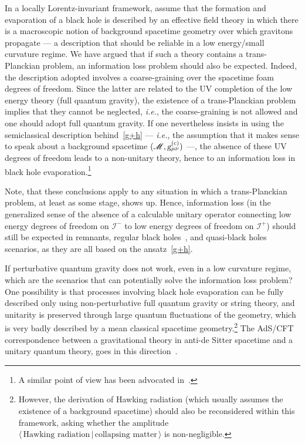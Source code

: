\documentclass[prd,groupedaddress, showpacs, showkeys, onecolumn, nofootinbib, 12pt]{revtex4-2}
\def\g{{\mbox{\sl g}}}%
\def\ie{{\em i.e.\/}}%
\newcommand{\scri}{\mathscr{I}}
\begin{document}
In a locally Lorentz-invariant framework, assume that the formation and evaporation of a black hole is described by an effective field theory in which there is a macroscopic notion of background spacetime geometry over which gravitons propagate --- a description that should be reliable in a low energy/small curvature regime.  We have argued that if such a theory contains a trans-Planckian problem, an information loss problem should also be expected.  Indeed, the description adopted involves a coarse-graining over the spacetime foam degrees of freedom.  Since the latter are related to the UV completion of the low energy theory (full quantum gravity), the existence of a trans-Planckian problem implies that they cannot be neglected, \ie, the coarse-graining is not allowed and one should adopt full quantum gravity.  If one nevertheless insists in using the semiclassical description behind~\eqref{g+h} --- \ie, the assumption  that it makes sense to speak about a background spacetime $(\mathscr{M},\g_{\mu\nu}^\mathrm{(c)})$ ---, the absence of these UV degrees of freedom leads to a non-unitary theory, hence to an information loss in black hole evaporation.\footnote{A similar point of view has been advocated in~\cite{Amati:2006fr}.}

Note, that these conclusions apply to any situation in which a trans-Planckian problem, at least as some stage, shows up. Hence, information loss (in the generalized sense of the absence of a calculable unitary operator connecting low energy degrees of freedom on $\scri^-$ to low energy degrees of freedom on $\scri^+$) should still be expected in remnants, regular black holes~\cite{Hayward,Ashtekar}, and quasi-black holes~\cite{Visser:2009xp,Visser:2009pw} scenarios, as they are all based on the ansatz~\eqref{g+h}. 

If perturbative quantum gravity does not work, even in a low curvature regime, which are the scenarios that can potentially solve the information loss problem?  One possibility is that processes involving black hole evaporation can be fully described only using non-perturbative full quantum gravity or string theory, and unitarity is preserved through large quantum fluctuations of the geometry, which is very badly described by a mean classical spacetime geometry.\footnote{However, the derivation of Hawking radiation (which usually assumes the existence of a background spacetime) should also be reconsidered within this framework, asking whether the amplitude $\langle\,\mbox{Hawking radiation}\,|\,\mbox{collapsing matter}\,\rangle$ is non-negligible.}  The AdS/CFT correspondence between a gravitational theory in anti-de Sitter spacetime and a unitary quantum theory, goes in this direction~\cite{Lowe:1999pk, Hawking:2005kf}.
\end{document}
